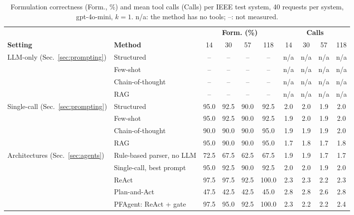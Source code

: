 \begin{table}[!ht]
\centering
\caption{Formulation correctness (Form., \%) and mean tool calls (Calls) per IEEE test system, 40 requests per system, gpt-4o-mini, $k=1$. n/a: the method has no tools; --: not measured.}
\label{tab:pf_by_system}
\scriptsize
\setlength{\tabcolsep}{3pt}
\begin{tabular}{ll cccc cccc}
\toprule
& & \multicolumn{4}{c}{\textbf{Form. (\%)}} & \multicolumn{4}{c}{\textbf{Calls}} \\
\cmidrule(lr){3-6}\cmidrule(lr){7-10}
\textbf{Setting} & \textbf{Method} & 14 & 30 & 57 & 118 & 14 & 30 & 57 & 118 \\
\midrule
\multirow{4}{*}{LLM-only (Sec.~\ref{sec:prompting})} & Structured & -- & -- & -- & -- & n/a & n/a & n/a & n/a \\
 & Few-shot & -- & -- & -- & -- & n/a & n/a & n/a & n/a \\
 & Chain-of-thought & -- & -- & -- & -- & n/a & n/a & n/a & n/a \\
 & RAG & -- & -- & -- & -- & n/a & n/a & n/a & n/a \\
\midrule
\multirow{4}{*}{Single-call (Sec.~\ref{sec:prompting})} & Structured & 95.0 & 92.5 & 90.0 & 92.5 & 2.0 & 2.0 & 1.9 & 2.0 \\
 & Few-shot & 95.0 & 92.5 & 90.0 & 92.5 & 1.9 & 2.0 & 1.9 & 2.0 \\
 & Chain-of-thought & 90.0 & 90.0 & 90.0 & 95.0 & 1.9 & 1.9 & 1.9 & 2.0 \\
 & RAG & 95.0 & 90.0 & 90.0 & 95.0 & 1.7 & 1.8 & 1.7 & 1.8 \\
\midrule
\multirow{5}{*}{Architectures (Sec.~\ref{sec:agents})} & Rule-based parser, no LLM & 72.5 & 67.5 & 62.5 & 67.5 & 1.9 & 1.9 & 1.7 & 1.7 \\
 & Single-call, best prompt & 95.0 & 92.5 & 90.0 & 92.5 & 2.0 & 2.0 & 1.9 & 2.0 \\
 & ReAct & 97.5 & 97.5 & 92.5 & 100.0 & 2.3 & 2.3 & 2.2 & 2.3 \\
 & Plan-and-Act & 47.5 & 42.5 & 42.5 & 45.0 & 2.8 & 2.8 & 2.6 & 2.8 \\
 & PFAgent: ReAct + gate & 97.5 & 95.0 & 92.5 & 100.0 & 2.3 & 2.2 & 2.2 & 2.4 \\
\bottomrule
\end{tabular}
\end{table}
